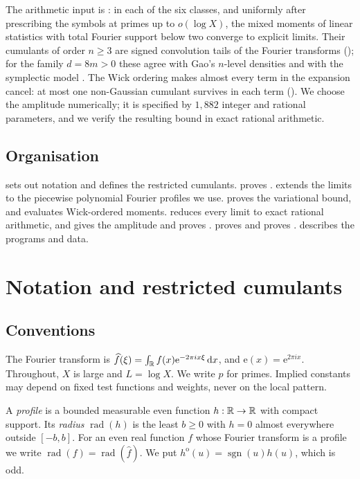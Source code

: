 \documentclass[11pt,colorlinks]{charlie}
\newcommand{\sgn}{\operatorname{sgn}}
\newcommand{\rad}{\operatorname{rad}}
\newcommand{\ho}[1]{#1^{\mathrm{o}}}
\newcommand{\e}{\mathrm{e}}
\begin{document}
The arithmetic input is : in each of the six classes, and uniformly after prescribing the symbols at primes up to $o(\log X)$, the mixed moments of linear statistics with total Fourier support below two converge to explicit limits. Their cumulants of order $n\ge3$ are signed convolution tails of the Fourier transforms (); for the family $d=8m>0$ these agree with Gao's $n$-level densities and with the symplectic model \cite{Gao,ERR}. The Wick ordering makes almost every term in the expansion cancel: at most one non-Gaussian cumulant survives in each term (). We choose the amplitude numerically; it is specified by $1{,}882$ integer and rational parameters, and we verify the resulting bound in exact rational arithmetic.

\subsection{Organisation}
 sets out notation and defines the restricted cumulants.  proves .  extends the limits to the piecewise polynomial Fourier profiles we use.  proves the variational bound, and  evaluates Wick-ordered moments.  reduces every limit to exact rational arithmetic, and  gives the amplitude and proves .  proves  and  proves .  describes the programs and data.

\section{Notation and restricted cumulants}\label{sec:notation}

\subsection{Conventions}
The Fourier transform is $\widehat f(\xi)=\int_\R f(x)\e^{-2\pi i x\xi}\dd x$, and $\e(x)=\e^{2\pi ix}$. Throughout, $X$ is large and $L=\log X$. We write $p$ for primes. Implied constants may depend on fixed test functions and weights, never on the local pattern.

A \emph{profile} is a bounded measurable even function $h:\mathbb{R}\to\mathbb{R}$ with compact support. Its \emph{radius} $\rad(h)$ is the least $b\ge0$ with $h=0$ almost everywhere outside $[-b,b]$. For an even real function $f$ whose Fourier transform is a profile we write $\rad(f)=\rad(\widehat f)$. We put $\ho h(u)=\sgn(u)h(u)$, which is odd.
\end{document}
